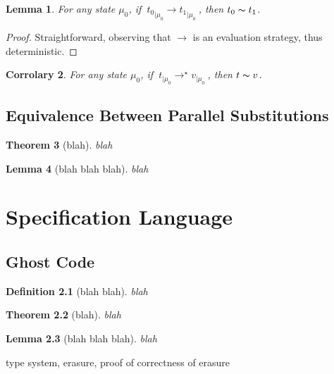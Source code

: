 \documentclass[a4paper,12pt,oneside]{report}
\theoremstyle{plain}
\newtheorem{definition}{Definition}[section]
\newtheorem{lemma}[definition]{Lemma}
\newtheorem{theorem}[definition]{Theorem}
\newtheorem{corr}[definition]{Corrolary}
\newcommand{\evalstep}[4]{~#1_{|\mu_#2} \rightarrow #3_{|\mu_#4} ~}
\newcommand{\evalstar}[4]{~#1_{|\mu_#2} \rightarrow^{\star} #3_{|\mu_#4} ~}
\newcommand{\eqv}[2]{#1 \thicksim #2}
\begin{document}
	\begin{lemma}
		For any state $\mu_0$, if $\evalstep{{t_0}}{0}{{t_1}}{0}$, then
		$\eqv{t_0}{t_1}$.
	\end{lemma}	
	\begin{proof}
		Straightforward, observing that $\rightarrow$ is an evaluation
		strategy, thus deterministic.
	\end{proof}		

	\begin{corr} 
		For any state $\mu_0$, if $\evalstar{{t}}{0}{{v}}{0}$, then		
		$\eqv{t}{v}$.
	\end{corr}


%

\section{Equivalence Between Parallel Substitutions}


\begin{theorem}[blah] 
blah
\end{theorem}

\begin{lemma}[blah blah blah]
blah
\end{lemma}

\chapter{Specification Language}

\section{Ghost Code}

\begin{definition}[blah blah] blah
\end{definition}

\begin{theorem}[blah] 
blah
\end{theorem}

\begin{lemma}[blah blah blah]
blah
\end{lemma}

type system, erasure, proof of correctness of erasure
\end{document}

